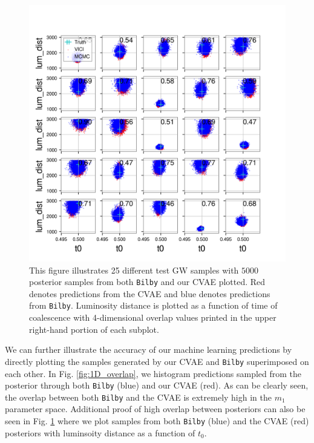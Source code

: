 \documentclass[%
showpacs,
 amsmath,amssymb,
 aps,
 twocolumn,
 prl,
 reprint,
floatfix,
]{revtex4-1}
\begin{document}
%
%
\begin{figure}
    \includegraphics[width=\columnwidth]{images/posteriors_13.png}
    \caption{\label{fig:lum_dist-t0_scatter} This figure illustrates 
    25 different test GW samples with $5000$ posterior samples 
    from both \texttt{Bilby} and our CVAE plotted. Red denotes predictions 
    from the CVAE and blue denotes predictions from \texttt{Bilby}. Luminosity 
    distance is plotted as a function of time of coalescence with 
    4-dimensional overlap values printed in the upper right-hand 
    portion of each subplot.}
\end{figure}

We can further illustrate the accuracy of our machine 
learning predictions by directly plotting the samples 
generated by our CVAE and \texttt{Bilby} superimposed on each other. 
In Fig. \ref{fig:1D_overlap}, we histogram predictions sampled 
from the posterior through both \texttt{Bilby} (blue) and our CVAE (red). 
As can be clearly seen, the overlap between both \texttt{Bilby} and 
the CVAE is extremely high in the $m_1$ parameter space. Additional 
proof of high overlap between posteriors can also be seen 
in Fig. \ref{fig:lum_dist-t0_scatter} where 
we plot samples from both \texttt{Bilby} (blue) and the CVAE (red) posteriors 
with luminsoity distance as a function of $t_0$. 
\end{document}
